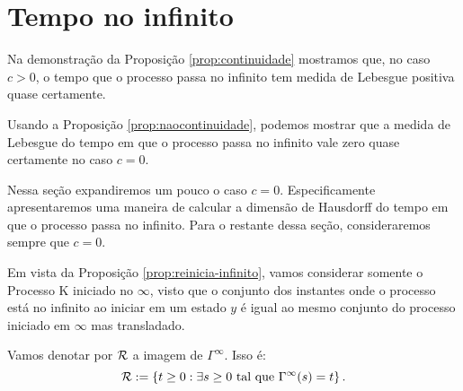 
\section{Tempo no infinito}
\label{sec:tempo-infinito}

Na demonstração da Proposição \ref{prop:continuidade} mostramos que,
no caso $c > 0$, o tempo que o processo passa no infinito tem medida
de Lebesgue positiva quase certamente.

Usando a Proposição \ref{prop:naocontinuidade}, podemos mostrar que a
medida de Lebesgue do tempo em que o processo passa no infinito vale
zero quase certamente no caso $c = 0$.

Nessa seção expandiremos um pouco o caso $c = 0$. Especificamente
apresentaremos uma maneira de calcular a dimensão de Hausdorff do
tempo em que o processo passa no infinito.  Para o restante dessa
seção, consideraremos sempre que $c = 0$.

Em vista da Proposição \ref{prop:reinicia-infinito}, vamos considerar
somente o Processo K iniciado no $\infty$, visto que o conjunto dos
instantes onde o processo está no infinito ao iniciar em um estado $y$
é igual ao mesmo conjunto do processo iniciado em $\infty$ mas
transladado.

\begin{definicao}
  Vamos denotar por ${\mathcal{R}}$ a imagem de $\Gamma^\infty$. Isso é:
  \begin{displaymath}
    {\mathcal{R}} := \left\{
      t \geq 0 : \exists s \geq 0 \textrm{ tal que } \Gamma^\infty(s) = t
    \right\}.
  \end{displaymath}
\end{definicao}

